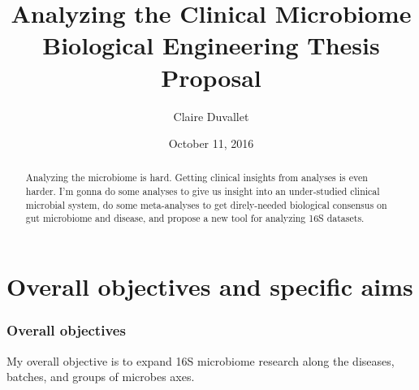\documentclass[12pt]{report}
\title{Analyzing the Clinical Microbiome \\ Biological Engineering Thesis Proposal}
\author{Claire Duvallet}
\date{October 11, 2016}
\begin{document}
\maketitle

\begin{abstract}
Analyzing the microbiome is hard. Getting clinical insights from analyses is even harder. I'm gonna do some analyses to give us insight into an under-studied clinical microbial system, do some meta-analyses to get direly-needed biological consensus on gut microbiome and disease, and propose a new tool for analyzing 16S datasets.
\end{abstract}

\tableofcontents

\chapter*{Overall objectives and specific aims}
\subsection*{Overall objectives}
My overall objective is to expand 16S microbiome research along the diseases, batches, and groups of microbes axes.
\end{document}
